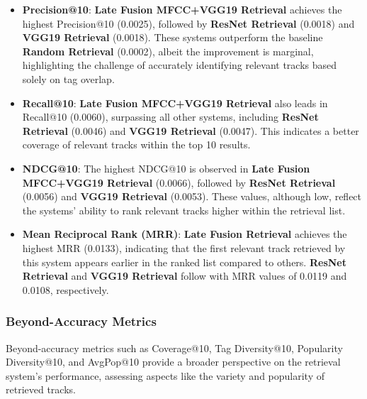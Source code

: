 \documentclass[sigconf]{acmart}
\begin{document}
\begin{itemize}
    \item \textbf{Precision@10}: \textbf{Late Fusion MFCC+VGG19 Retrieval} achieves the highest Precision@10 (0.0025), followed by \textbf{ResNet Retrieval} (0.0018) and \textbf{VGG19 Retrieval} (0.0018). These systems outperform the baseline \textbf{Random Retrieval} (0.0002), albeit the improvement is marginal, highlighting the challenge of accurately identifying relevant tracks based solely on tag overlap.
    
    \item \textbf{Recall@10}: \textbf{Late Fusion MFCC+VGG19 Retrieval} also leads in Recall@10 (0.0060), surpassing all other systems, including \textbf{ResNet Retrieval} (0.0046) and \textbf{VGG19 Retrieval} (0.0047). This indicates a better coverage of relevant tracks within the top 10 results.
    
    \item \textbf{NDCG@10}: The highest NDCG@10 is observed in \textbf{Late Fusion MFCC+VGG19 Retrieval} (0.0066), followed by \textbf{ResNet Retrieval} (0.0056) and \textbf{VGG19 Retrieval} (0.0053). These values, although low, reflect the systems' ability to rank relevant tracks higher within the retrieval list.
    
    \item \textbf{Mean Reciprocal Rank (MRR)}: \textbf{Late Fusion  Retrieval} achieves the highest MRR (0.0133), indicating that the first relevant track retrieved by this system appears earlier in the ranked list compared to others. \textbf{ResNet Retrieval} and \textbf{VGG19 Retrieval} follow with MRR values of 0.0119 and 0.0108, respectively.
\end{itemize}

\subsubsection{Beyond-Accuracy Metrics}
\label{subsubsec:beyond_accuracy_metrics}

Beyond-accuracy metrics such as Coverage@10, Tag Diversity@10, Popularity Diversity@10, and AvgPop@10 provide a broader perspective on the retrieval system’s performance, assessing aspects like the variety and popularity of retrieved tracks.
\end{document}
